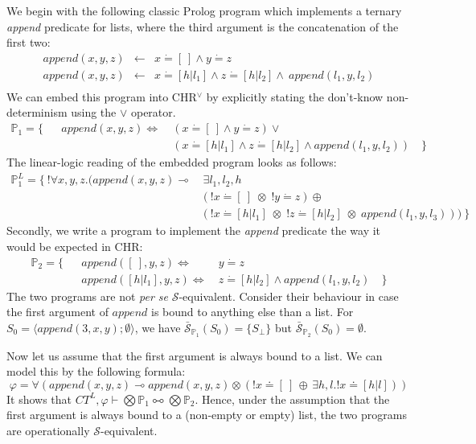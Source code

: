 \documentclass[acmtocl]{acmtrans2m}
\newcommand{\de}{\dot=}
\newcommand\state[1]{\langle #1 \rangle}
\newcommand{\bbP}{\ensuremath{\mathbb{P}}}
\newcommand{\cS}{\ensuremath{\mathcal{S}}}
\newcommand{\bcS}{\ensuremath{\bar{\mathcal{S}}}}
\newcommand{\x}{{\;\otimes\;}}
\newcommand{\lp}{\multimap}
\newcommand{\lpl}{\multimapboth}
\begin{document}
\begin{example}
\label{example:append}
We begin with the following
classic Prolog program which implements a ternary \emph{append} predicate for
lists, where the third argument is the concatenation of the first two: \[
  \begin{array}{lcl}
    append(x,y,z) & \leftarrow &
            x\de[~] \wedge y\de z \\
    append(x,y,z) & \leftarrow &
            x\de\left[h | l_1\right] \wedge
            z\de\left[h | l_2\right]
             \wedge ~append(l_1,y,l_2)\\
  \end{array}
\]
We can embed this program into CHR$^\vee$ by explicitly stating the
don't-know non-determinism using the $\vee$ operator.
\begin{align*}
\bbP_1= \{& & append(x,y,z) \Leftrightarrow~ &
    	( {x\de[~]}\wedge {y\de z} ) \vee \\
 & & & (x\de \left[h | l_1\right]\wedge
      z\de\left[h | l_2\right]\wedge append(l_1,y,l_2) )\quad\}
\end{align*}
The linear-logic reading of the embedded program looks as follows:
  \begin{align*}
    \bbP_1^L =
    \{\:
    ! \forall x,y,z.( append(x,y,z)\lp &
          ~\exists l_1,l_2,h\\
	&
       ( !x\de[~] \x !y\de z) \oplus \\
    &
	(
		!x\de[h|l_1] \x !z\de[h|l_2] \x
        append(l_1,y,l_3))
    )
    \:\}
\end{align*}
Secondly, we write a program to implement the \emph{append} predicate the way it
would be expected in CHR:
\begin{align*}
\bbP_2= \{& & append([~],y,z) \Leftrightarrow~ &
    	{y\de z} \\
 & & append([h | l_1],y,z) \Leftrightarrow~ &
 		z\de[h | l_2]\wedge append(l_1,y,l_2) \quad \}
\end{align*}
The two programs are not \emph{per se} $\cS$-equivalent. Consider their
behaviour in case the first argument of $append$ is bound to anything else than a list. For
$S_0=\state{append(3,x,y);\emptyset}$, we have $\bcS_{\bbP_1}(S_0)=\{ S_\bot \}$
but  $\bcS_{\bbP_2}(S_0)=\emptyset$.

Now let us assume that the first argument is always bound to a list. We can model
this by the following formula: \[ \varphi=\forall(append(x,y,z)\lp
append(x,y,z)\otimes (!x\doteq[~] \,\oplus\, \exists h,l.!x\doteq[h|l])) \] It shows that
$CT^L,\varphi\vdash\bigotimes\bbP_1\lpl
\bigotimes\bbP_2$. Hence, under the
assumption that the first argument is always bound to a (non-empty or empty)
list, the two programs are operationally $\cS$-equivalent.


\end{example}
\end{document}

